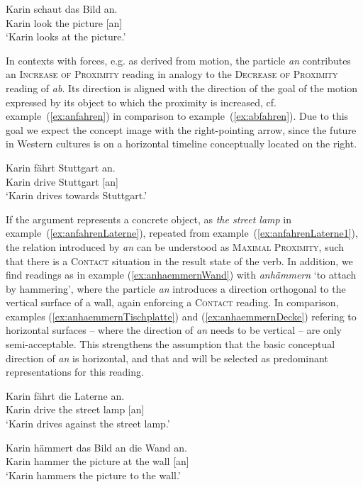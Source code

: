 \documentclass[output=paper]{langsci/langscibook}
\begin{document}
\ea\label{ex:anschauen}
\gll Karin schaut das Bild an.\\
Karin look the picture [an]\\
\glt `Karin looks at the picture.'
\z

In contexts with forces, e.g. as derived from motion, the particle
\textit{an} contributes an \textsc{Increase of Proximity} reading in
analogy to the \textsc{Decrease of Proximity} reading of
\textit{ab}. Its direction is aligned with the direction of the goal
of the motion expressed by its object to which the proximity is
increased, cf. example~(\ref{ex:anfahren}) in comparison to
example~(\ref{ex:abfahren}). Due to this goal we expect the concept image
 with the right-pointing arrow, since the future in
Western cultures is on a horizontal timeline conceptually located on
the right.

\ea\label{ex:anfahren}
\gll Karin fährt Stuttgart an.\\
Karin drive Stuttgart [an]\\
\glt `Karin drives towards Stuttgart.'
\z

If the argument represents a concrete object, as \textit{the street lamp}
in example~(\ref{ex:anfahrenLaterne}), repeated from
example~(\ref{ex:anfahrenLaterne1}), the relation introduced by
\textit{an} can be understood as \textsc{Maximal Proximity}, such that
there is a \textsc{Contact} situation in the result state of the
verb. In addition, we find readings as in example
(\ref{ex:anhaemmernWand}) with \textit{anhämmern} `to attach by
hammering', where the particle \textit{an} introduces a direction
orthogonal to the vertical surface of a wall, again enforcing a
\textsc{Contact} reading. In comparison, examples
(\ref{ex:anhaemmernTischplatte}) and (\ref{ex:anhaemmernDecke})
refering to horizontal surfaces -- where the direction of \textit{an}
needs to be vertical -- are only semi-acceptable. This strengthens the
assumption that the basic conceptual direction of \textit{an} is
horizontal, and that  and  will
be selected as predominant representations for this reading.

\ea\label{ex:anfahrenLaterne}
\gll Karin fährt die Laterne an.\\
Karin drive the {street lamp} [an]\\
\glt `Karin drives against the street lamp.'
\z

\ea\label{ex:anhaemmernWand}
\gll Karin hämmert das Bild an die Wand an.\\
Karin hammer the picture at the wall [an]\\
\glt `Karin hammers the picture to the wall.'
\z
\end{document}
